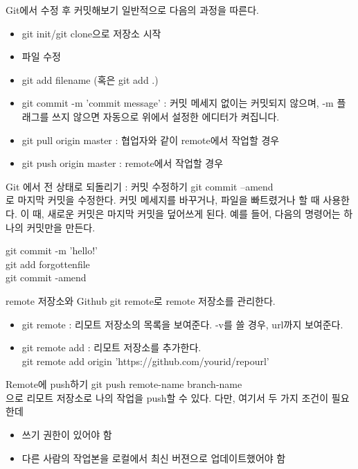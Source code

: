 \documentclass{beamer}
\begin{document}
\begin{frame}{Git에서 수정 후 커밋해보기}
일반적으로 다음의 과정을 따른다. 
\begin{itemize} 
\item git init/git clone으로 저장소 시작 
\item 파일 수정 
\item git add filename (혹은 git add .) 
\item git commit -m 'commit message' : 커밋 메세지 없이는 커밋되지 않으며, -m 플래그를 쓰지 않으면 자동으로 위에서 설정한 에디터가 켜집니다. 
\item git pull origin master : 협업자와 같이 remote에서 작업할 경우 
\item git push origin master : remote에서 작업할 경우
\end{itemize}
\end{frame}


\begin{frame}{Git 에서 전 상태로 되돌리기 : 커밋 수정하기}
git commit --amend \\
로 마지막 커밋을 수정한다. 커밋 메세지를 바꾸거나, 파일을 빠트렸거나 할 때 사용한다. 이 때, 새로운 커밋은 마지막 커밋을 덮어쓰게 된다. 예를 들어, 다음의 명령어는 하나의 커밋만을 만든다. 

git commit -m 'hello!' \\
git add forgottenfile \\
git commit -amend \\
\end{frame}




\begin{frame}{remote 저장소와 Github}
git remote로 remote 저장소를 관리한다. 

\begin{itemize} 
\item git remote : 리모트 저장소의 목록을 보여준다. -v를 쓸 경우, url까지 보여준다. 
\item git remote add : 리모트 저장소를 추가한다. \\
git remote add origin 'https://github.com/yourid/repourl'
\end{itemize}

\end{frame}

\begin{frame}{Remote에 push하기}
git push remote-name branch-name\\
으로 리모트 저장소로 나의 작업을 push할 수 있다. 다만, 여기서 두 가지 조건이 필요한데 
\begin{itemize} 
\item 쓰기 권한이 있어야 함
\item 다른 사람의 작업본을 로컬에서 최신 버젼으로 업데이트했어야 함
\end{itemize}
\end{frame}
\end{document}
